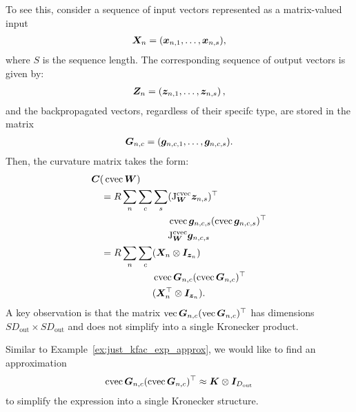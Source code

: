 To see this, consider a sequence of input vectors represented as a matrix-valued input
\begin{align*}
  {\bm{X}}_n = ({\bm{x}}_{n, 1}, \dots, {\bm{x}}_{n, s}),
\end{align*}
where $S$ is the sequence length.
The corresponding sequence of output vectors is given by:
\begin{align*}
{\bm{Z}}_n = \left( {\bm{z}}_{n, 1}, \dots, {\bm{z}}_{n,s} \right),
\end{align*}
and the backpropagated vectors, regardless of their specifc type, are stored in the matrix
\begin{align*}
{\bm{G}}_{n, c} = ({\bm{g}}_{n, c, 1}, \dots, {\bm{g}}_{n, c, s}).
\end{align*}
Then, the curvature matrix takes the form:
\begin{align*}
  {\bm{C}}(&\operatorname{cvec} {\bm{W}}) \\
  &\begin{aligned}
  =R\sum_n \sum_c \sum_s
    &(\mathrm{J}^{\operatorname{cvec}}_{{\bm{W}}}{\bm{z}}_{n,s})^{\top} \\
    &\operatorname{cvec}{\bm{g}}_{n,c,s} (\operatorname{cvec}{\bm{g}}_{n,c,s})^{\top} \\
    &\mathrm{J}^{\operatorname{cvec}}_{{\bm{W}}}{\bm{g}}_{n,c,s}
  \end{aligned}\\
 &\begin{aligned}
  = R \sum_n \sum_c &({\bm{X}}_n \otimes {\bm{I}}_{{\bm{z}}_n}) \\
  &\operatorname{cvec} {\bm{G}}_{n,c}(\operatorname{cvec} {\bm{G}}_{n,c})^{\top} \\
  &({\bm{X}}_n^{\top} \otimes {\bm{I}}_{{\bm{z}}_n}).
  \end{aligned}
\end{align*}
A key observation is that the matrix $\operatorname{vec}{\bm{G}}_{n,c} (\operatorname{vec}{\bm{G}}_{n,c})^{\top}$ has dimensions $S D_{\text{out}} \times S D_{\text{out}}$ and does not simplify into a single Kronecker product.

Similar to Example~\ref{ex:just_kfac_exp_approx}, we would like to find an approximation
\begin{align*}
\operatorname{cvec}{\bm{G}}_{n,c} (\operatorname{cvec}{\bm{G}}_{n,c})^{\top} \approx {\bm{K}} \otimes {\bm{I}}_{D_\text{out}}
\end{align*}
to simplify the expression into a single Kronecker structure.

